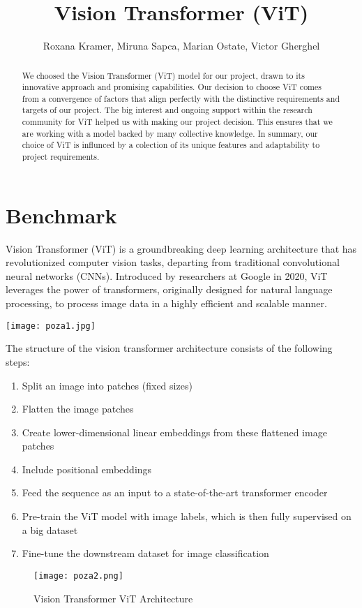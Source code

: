 \documentclass[runningheads]{llncs}
\begin{document}
\title{Vision Transformer (ViT)}
\author{Roxana Kramer, Miruna Sapca, Marian Ostate, Victor Gherghel}
\date{}
\maketitle


\begin{abstract}
    We choosed the Vision Transformer (ViT) model for our  project, drawn to its innovative approach and promising capabilities. Our decision to choose ViT comes from a convergence of factors that align perfectly with the distinctive requirements and targets of our project. 
    The big interest and ongoing support within the research community for ViT helped us with making our project decision. This ensures that we are working with a model backed by many collective knowledge.
    In summary, our choice of ViT is influnced by a colection of its unique features and adaptability to project requirements.
\end{abstract}



\section{Benchmark}
Vision Transformer (ViT) is a groundbreaking deep learning architecture that has revolutionized computer vision tasks, departing from traditional convolutional neural networks (CNNs). Introduced by researchers at Google in 2020, ViT leverages the power of transformers, originally designed for natural language processing, to process image data in a highly efficient and scalable manner.
\vspace{10mm}
\begin{center}
\texttt{[image: poza1.jpg]}
\end{center}
\newpage
The structure of the vision transformer architecture consists of the following steps: 

\begin{enumerate} 
    \item Split an image into patches (fixed sizes)
    \item Flatten the image patches
    \item Create lower-dimensional linear embeddings from these flattened image patches
    \item Include positional embeddings
    \item Feed the sequence as an input to a state-of-the-art transformer encoder
    \item Pre-train the ViT model with image labels, which is then fully supervised on a big dataset
    \item Fine-tune the downstream dataset for image classification
\end{enumerate}
\begin{center}
\begin{figure}[h]
\texttt{[image: poza2.png]}
\caption{Vision Transformer ViT Architecture}
\end{figure}
\end{center}
\end{document}
